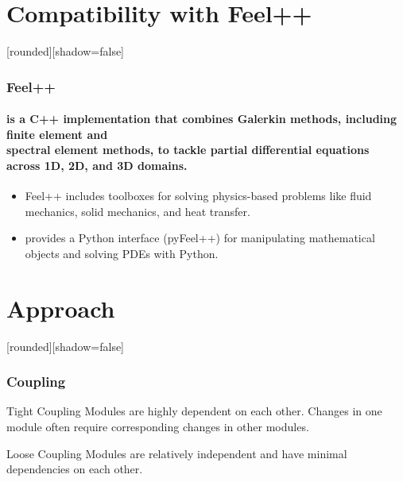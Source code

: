 \documentclass[10pt]{beamer}
\begin{document}
\section{Compatibility with Feel++}
\begin{frame}
    [rounded][shadow=false]
    \frametitle{Feel++}
    \framesubtitle{is a C++ implementation that combines Galerkin methods, including finite element and \\spectral element methods, to tackle partial differential equations across 1D, 2D, and 3D domains.}

    \begin{itemize}
        \item Feel++ includes toolboxes for solving physics-based problems like fluid mechanics, solid mechanics, and heat transfer.
        
        
        \item  provides a Python interface (pyFeel++) for manipulating mathematical objects and solving PDEs with Python. 
        
        
    \end{itemize}
\end{frame}



\section{Approach}

\begin{frame}
    [rounded][shadow=false]
    \frametitle{Coupling}
    \begin{block}{Tight Coupling}
    Modules are highly dependent on each other. Changes in one module often require corresponding changes in other modules.

    \end{block}

    \begin{block}{Loose Coupling}
    Modules are relatively independent and have minimal dependencies on each other.


    \end{block}
\end{frame}
\end{document}
